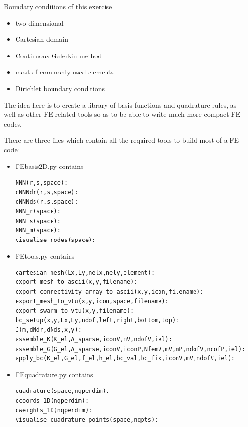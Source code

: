 
Boundary conditions of this exercise
\begin{itemize}
\item two-dimensional
\item Cartesian domain
\item Continuous Galerkin method
\item most of commonly used elements 
\item Dirichlet boundary conditions
\end{itemize}



The idea here is to create a library of basis functions and quadrature rules, as well as 
other FE-related tools so as to be able to write much more compact FE codes. 

There are three files which contain all the required tools to build most of a FE code:

\begin{itemize}

\item {\pythonfile FEbasis2D.py} contains 
\begin{lstlisting}
NNN(r,s,space):
dNNNdr(r,s,space):
dNNNds(r,s,space):
NNN_r(space):
NNN_s(space):
NNN_m(space):
visualise_nodes(space):
\end{lstlisting}



\item {\pythonfile FEtools.py} contains

\begin{lstlisting}
cartesian_mesh(Lx,Ly,nelx,nely,element):
export_mesh_to_ascii(x,y,filename):
export_connectivity_array_to_ascii(x,y,icon,filename):
export_mesh_to_vtu(x,y,icon,space,filename):
export_swarm_to_vtu(x,y,filename):
bc_setup(x,y,Lx,Ly,ndof,left,right,bottom,top):
J(m,dNdr,dNds,x,y):
assemble_K(K_el,A_sparse,iconV,mV,ndofV,iel):
assemble_G(G_el,A_sparse,iconV,iconP,NfemV,mV,mP,ndofV,ndofP,iel):
apply_bc(K_el,G_el,f_el,h_el,bc_val,bc_fix,iconV,mV,ndofV,iel):
\end{lstlisting}

\item {\pythonfile FEquadrature.py} contains

\begin{lstlisting}
quadrature(space,nqperdim):
qcoords_1D(nqperdim):
qweights_1D(nqperdim):
visualise_quadrature_points(space,nqpts):
\end{lstlisting}

\end{itemize}

